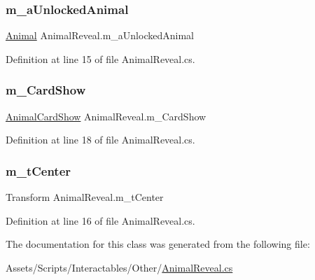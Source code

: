 \subsubsection{\texorpdfstring{m\+\_\+a\+Unlocked\+Animal}{m\_aUnlockedAnimal}}
{\footnotesize\ttfamily \mbox{\hyperlink{class_animal}{Animal}} Animal\+Reveal.\+m\+\_\+a\+Unlocked\+Animal}



Definition at line 15 of file Animal\+Reveal.\+cs.

\mbox{\label{class_animal_reveal_a3555f60772d79b3e9e2dfe275843e7a3}} 
\subsubsection{\texorpdfstring{m\+\_\+\+Card\+Show}{m\_CardShow}}
{\footnotesize\ttfamily \mbox{\hyperlink{class_animal_card_show}{Animal\+Card\+Show}} Animal\+Reveal.\+m\+\_\+\+Card\+Show}



Definition at line 18 of file Animal\+Reveal.\+cs.

\mbox{\label{class_animal_reveal_acd26588c1ef170e01892b2feea2ac0db}} 
\subsubsection{\texorpdfstring{m\+\_\+t\+Center}{m\_tCenter}}
{\footnotesize\ttfamily Transform Animal\+Reveal.\+m\+\_\+t\+Center}



Definition at line 16 of file Animal\+Reveal.\+cs.



The documentation for this class was generated from the following file\+:\begin{DoxyCompactItemize}
\item 
Assets/\+Scripts/\+Interactables/\+Other/\mbox{\hyperlink{_animal_reveal_8cs}{Animal\+Reveal.\+cs}}\end{DoxyCompactItemize}

